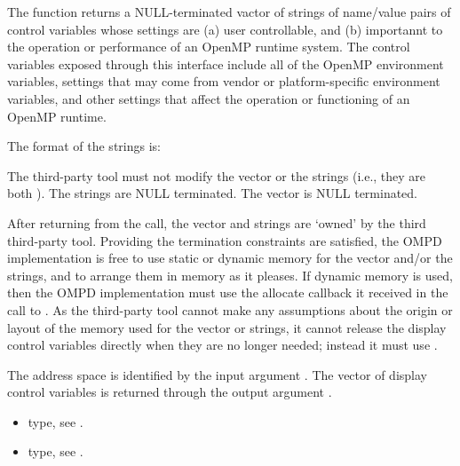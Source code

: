 \descr
The function  returns a
NULL-terminated vactor of strings of name/value pairs of control
variables whose settings are (a) user controllable,
and (b) importannt to the operation or performance of an OpenMP
runtime system.
The control variables exposed through this interface include all
of the OpenMP environment variables, settings that may come from
vendor or platform-specific environment variables, and other
settings that affect the operation or functioning of an OpenMP
runtime.

The format of the strings is:
\begin{center}
\end{center}

The third-party tool must not modify the vector or the strings
(i.e., they are both ).
The strings are NULL terminated.
The vector is NULL terminated.

After returning from the call, the vector and strings are `owned'
by the third third-party tool.
Providing the termination constraints are satisfied, the OMPD
implementation is free to use static or dynamic memory for the
vector and/or the strings, and to arrange them in memory
as it pleases.
If dynamic memory is used, then the OMPD implementation must use
the allocate callback it received in the call to .
As the third-party tool cannot make any assumptions about the origin or
layout of the memory used for the vector or strings, it cannot release
the display control variables directly when they are no longer
needed; instead it must use .

\argdesc
The address space is identified by the input argument .
The vector of display control variables is returned through
the output argument .

\crossreferences
\begin{itemize}
	\item {} type, see .
	\item {} type, see .
\end{itemize}


\label{ompd:ompd_release_display_control_vars}
\label{sec:ompd_release_display_control_vars}
\summary

